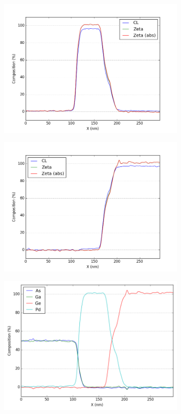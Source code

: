 \begin{figure}
\begin{subfigure}{.5\textwidth}
			\includegraphics[width=\linewidth]{fig/q/1_pd_nm}
			\caption{}
			\label{fig:zeta_area1_pd}
		\end{subfigure}%
		\begin{subfigure}{.5\textwidth}
			\centering
			\includegraphics[width=\linewidth]{fig/q/1_ge_nm}
			\caption{}
			\label{fig:zeta_area1_ge}
	\end{subfigure}
		\begin{subfigure}{.5\textwidth}
			\centering
			\includegraphics[width=\linewidth]{fig/q/1_all_abscorr4}

\end{subfigure}
\end{figure}
